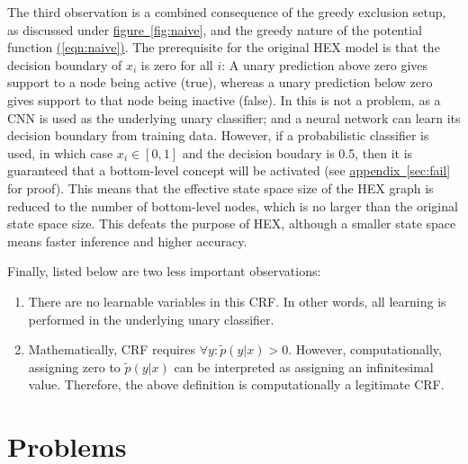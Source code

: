 \documentclass[11pt,a4paper]{book}
\begin{document}
The third observation is a combined consequence of the greedy exclusion setup, as discussed under \hyperref[fig:naive]{figure~\ref{fig:naive}}, and the greedy nature of the potential function \hyperref[eqn:naive]{(\ref{eqn:naive})}. The prerequisite for the original HEX model is that the decision boundary of $x_i$ is zero for all $i$: A unary prediction above zero gives support to a node being active (true), whereas a unary prediction below zero gives support to that node being inactive (false). In \cite{deng2014large} this is not a problem, as a CNN \cite{krizhevsky2012imagenet} is used as the underlying unary classifier; and a neural network can learn its decision boundary from training data. However, if a probabilistic classifier is used, in which case $x_i\in[0,1]$ and the decision boudary is 0.5, then it is guaranteed that a bottom-level concept will be activated (see \hyperref[sec:fail]{appendix~\ref{sec:fail}} for proof). This means that the effective state space size of the HEX graph is reduced to the number of bottom-level nodes, which is no larger than the original state space size. This defeats the purpose of HEX, although a smaller state space means faster inference and higher accuracy.

Finally, listed below are two less important observations:
\begin{enumerate}
\item There are no learnable variables in this CRF. In other words, all learning is performed in the underlying unary classifier.
\item Mathematically, CRF requires $\forall y:\tilde{p}(y|x)>0$. However, computationally, assigning zero to $\tilde{p}(y|x)$ can be interpreted as assigning an infinitesimal value. Therefore, the above definition is computationally a legitimate CRF.
\end{enumerate}

\section{Problems}
\label{sec:problem}
\end{document}
